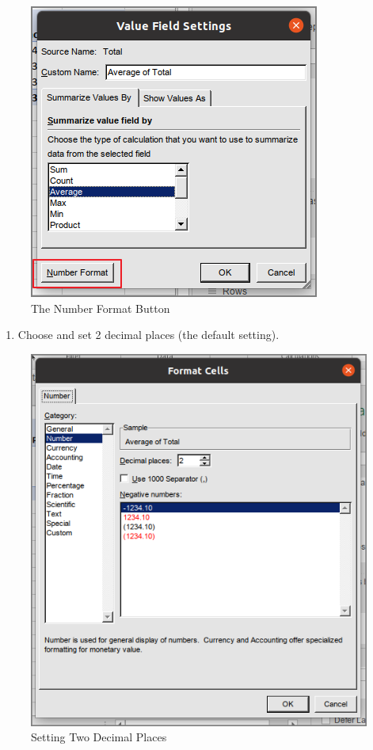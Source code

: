 \begin{enumerate}[resume]
\begin{figure}[H]
	\centering
	\includegraphics[width=\maxwidth{.95\linewidth}]{gfx/ch07_fig18}
	\caption{The Number Format Button}
	\label{07:fig18}
\end{figure}

\begin{enumerate}[resume]
		\item Choose  and set 2 decimal places (the default setting).
\end{enumerate}

\begin{figure}[H]
	\centering
	\includegraphics[width=\maxwidth{.95\linewidth}]{gfx/ch07_fig19}
	\caption{Setting Two Decimal Places}
	\label{07:fig19}
\end{figure}


\end{enumerate}

